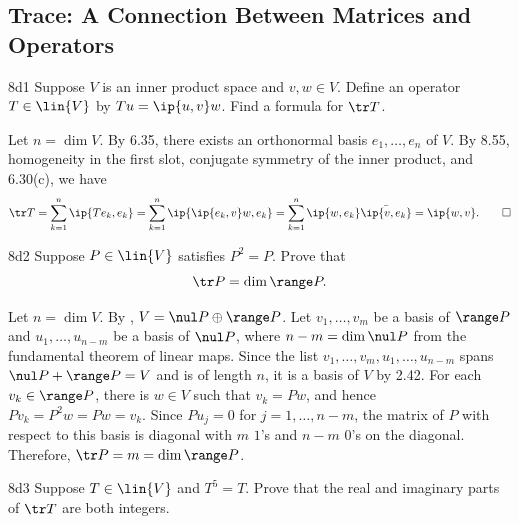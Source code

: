 \subsection{Trace: A Connection Between Matrices and Operators}

\begin{exercise}{8d1}
    Suppose $V$ is an inner product space and $v, w \in V$.
    Define an operator $T \in \lin{V}$ by $Tu = \ip{u, v} w$.
    Find a formula for $\tr T$.
\end{exercise}

\begin{sol}
    Let $n = \dim V$.
    By 6.35, there exists an orthonormal basis $e_1, \ldots, e_n$ of $V$.
    By 8.55, homogeneity in the first slot, conjugate symmetry of the inner product, and 6.30(c), we have
    \[
        \tr T = \sum_{k=1}^n \ip{Te_k, e_k} = \sum_{k=1}^n \ip{\ip{e_k, v} w, e_k} = \sum_{k=1}^n \ip{w, e_k} \bar{\ip{v, e_k}} = \ip{w, v}. \qedhere
    \]
\end{sol}

\begin{exercise}{8d2}
    Suppose $P \in \lin{V}$ satisfies $P^2 = P$.
    Prove that
    \[
        \tr P = \dim \range P.
    \]
\end{exercise}

\begin{sol}
    Let $n = \dim V$.
    By , $V = \nul P \oplus \range P$.
    Let $v_1, \ldots, v_m$ be a basis of $\range P$ and $u_1, \ldots, u_{n-m}$ be a basis of $\nul P$, where $n-m = \dim \nul P$ from the fundamental theorem of linear maps.
    Since the list $v_1, \ldots, v_m, u_1, \ldots, u_{n-m}$ spans $\nul P + \range P = V$ and is of length $n$, it is a basis of $V$ by 2.42.
    For each $v_k \in \range P$, there is $w \in V$ such that $v_k = P w$, and hence $P v_k = P^2 w = P w = v_k$.
    Since $P u_j = 0$ for $j = 1, \ldots, n-m$, the matrix of $P$ with respect to this basis is diagonal with $m$ $1$'s and $n-m$ $0$'s on the diagonal.
    Therefore, $\tr P = m = \dim \range P$.
\end{sol}

\begin{exercise}{8d3}
    Suppose $T \in \lin{V}$ and $T^5 = T$.
    Prove that the real and imaginary parts of $\tr T$ are both integers.
\end{exercise}

